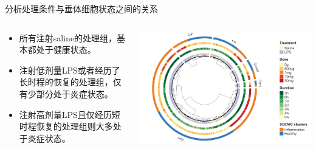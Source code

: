 \documentclass{beamer}
\begin{document}
\begin{frame}{分析处理条件与垂体细胞状态之间的关系}
  \begin{columns}
    \begin{column}{.5\linewidth}
      \begin{itemize}
        \item 所有注射saline的处理组，基本都处于健康状态。
        \item 注射低剂量LPS或者经历了长时程的恢复的处理组，仅有少部分处于炎症状态。
        \item 注射高剂量LPS且仅经历短时程恢复的处理组则大多处于炎症状态。
      \end{itemize}
    \end{column}

    \begin{column}{.5\linewidth}
      \includegraphics[width=\linewidth]{figs/expr-res3.png}
    \end{column}
  \end{columns}
\end{frame}
\end{document}
